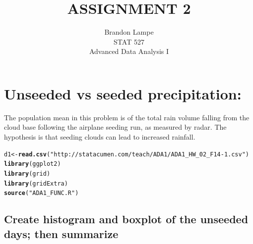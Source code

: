 \documentclass{article}\usepackage[]{graphicx}\usepackage[]{color}
\makeatletter
\newcommand{\hlstr}[1]{\textcolor[rgb]{0.192,0.494,0.8}{#1}}%
\newcommand{\hlstd}[1]{\textcolor[rgb]{0.345,0.345,0.345}{#1}}%
\newcommand{\hlkwb}[1]{\textcolor[rgb]{0.69,0.353,0.396}{#1}}%
\newcommand{\hlkwd}[1]{\textcolor[rgb]{0.737,0.353,0.396}{\textbf{#1}}}%
\newenvironment{kframe}{%
 \def\at@end@of@kframe{}%
 \ifinner\ifhmode%
  \def\at@end@of@kframe{\end{minipage}}%
  \begin{minipage}{\columnwidth}%
 \fi\fi%
 \def\FrameCommand##1{\hskip\@totalleftmargin \hskip-\fboxsep
 \colorbox{shadecolor}{##1}\hskip-\fboxsep
     \hskip-\linewidth \hskip-\@totalleftmargin \hskip\columnwidth}%
 \MakeFramed {\advance\hsize-\width
   \@totalleftmargin\z@ \linewidth\hsize
   \@setminipage}}%
 {\par\unskip\endMakeFramed%
 \at@end@of@kframe}
\newenvironment{knitrout}{}{} %
\makeatother
\begin{document}
\title{ASSIGNMENT 2}
\author{Brandon Lampe \\ STAT 527 \\ Advanced Data Analysis I}
\maketitle

\section{Unseeded vs seeded precipitation:}
The population mean in this problem is of the total rain volume falling from the
cloud base following the airplane seeding run, as measured by radar.  The hypothesis
is that seeding clouds can lead to increased rainfall.

\begin{knitrout}
\color{fgcolor}\begin{kframe}
\begin{alltt}
\hlstd{d1} \hlkwb{<-} \hlkwd{read.csv}\hlstd{(}\hlstr{"http://statacumen.com/teach/ADA1/ADA1_HW_02_F14-1.csv"}\hlstd{)}
\hlkwd{library}\hlstd{(ggplot2)}
\hlkwd{library}\hlstd{(grid)}
\hlkwd{library}\hlstd{(gridExtra)}
\hlkwd{source}\hlstd{(}\hlstr{"ADA1_FUNC.R"}\hlstd{)}
\end{alltt}
\end{kframe}
\end{knitrout}

\subsection{Create histogram and boxplot of the unseeded days; then summarize}
\end{document}
